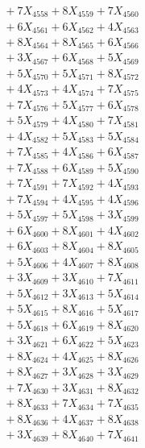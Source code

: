 \documentclass[a4paper,10pt]{article}
\begin{document}
{\begin{align}
&\;  + 7 X_{4558} + 8 X_{4559} + 7 X_{4560} \\[0.3ex]
&\;  + 6 X_{4561} + 6 X_{4562} + 4 X_{4563} \\[0.3ex]
&\;  + 8 X_{4564} + 8 X_{4565} + 6 X_{4566} \\[0.3ex]
&\;  + 3 X_{4567} + 6 X_{4568} + 5 X_{4569} \\[0.5ex]\allowbreak
&\;  + 5 X_{4570} + 5 X_{4571} + 8 X_{4572} \\[0.3ex]
&\;  + 4 X_{4573} + 4 X_{4574} + 7 X_{4575} \\[0.3ex]
&\;  + 7 X_{4576} + 5 X_{4577} + 6 X_{4578} \\[0.3ex]
&\;  + 5 X_{4579} + 4 X_{4580} + 7 X_{4581} \\[0.3ex]
&\;  + 4 X_{4582} + 5 X_{4583} + 5 X_{4584} \\[0.3ex]
&\;  + 7 X_{4585} + 4 X_{4586} + 6 X_{4587} \\[0.3ex]
&\;  + 7 X_{4588} + 6 X_{4589} + 5 X_{4590} \\[0.3ex]
&\;  + 7 X_{4591} + 7 X_{4592} + 4 X_{4593} \\[0.3ex]
&\;  + 7 X_{4594} + 4 X_{4595} + 4 X_{4596} \\[0.3ex]
&\;  + 5 X_{4597} + 5 X_{4598} + 3 X_{4599} \\[0.5ex]\allowbreak
&\;  + 6 X_{4600} + 8 X_{4601} + 4 X_{4602} \\[0.3ex]
&\;  + 6 X_{4603} + 8 X_{4604} + 8 X_{4605} \\[0.3ex]
&\;  + 5 X_{4606} + 4 X_{4607} + 8 X_{4608} \\[0.3ex]
&\;  + 3 X_{4609} + 3 X_{4610} + 7 X_{4611} \\[0.3ex]
&\;  + 5 X_{4612} + 3 X_{4613} + 5 X_{4614} \\[0.3ex]
&\;  + 5 X_{4615} + 8 X_{4616} + 5 X_{4617} \\[0.3ex]
&\;  + 5 X_{4618} + 6 X_{4619} + 8 X_{4620} \\[0.3ex]
&\;  + 3 X_{4621} + 6 X_{4622} + 5 X_{4623} \\[0.3ex]
&\;  + 8 X_{4624} + 4 X_{4625} + 8 X_{4626} \\[0.3ex]
&\;  + 8 X_{4627} + 3 X_{4628} + 3 X_{4629} \\[0.5ex]\allowbreak
&\;  + 7 X_{4630} + 3 X_{4631} + 8 X_{4632} \\[0.3ex]
&\;  + 8 X_{4633} + 7 X_{4634} + 7 X_{4635} \\[0.3ex]
&\;  + 8 X_{4636} + 4 X_{4637} + 8 X_{4638} \\[0.3ex]
&\;  + 3 X_{4639} + 8 X_{4640} + 7 X_{4641} \\[0.3ex]

\end{align}}
\end{document}
